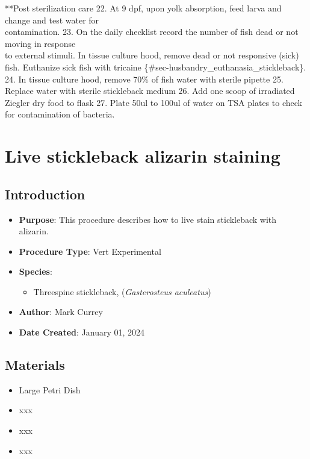 \documentclass[
  letterpaper,
  DIV=11,
  numbers=noendperiod]{scrreprt}
\providecommand{\tightlist}{%
  \setlength{\itemsep}{0pt}\setlength{\parskip}{0pt}}\usepackage{longtable,booktabs,array}
\begin{document}
**Post sterilization care 22. At 9 dpf, upon yolk absorption, feed larva
and change and test water for\\
contamination. 23. On the daily checklist record the number of fish dead
or not moving in response\\
to external stimuli. In tissue culture hood, remove dead or not
responsive (sick) fish. Euthanize sick fish with tricaine
\{\#sec-husbandry\_euthanasia\_stickleback\}. 24. In tissue culture
hood, remove 70\% of fish water with sterile pipette 25. Replace water
with sterile stickleback medium 26. Add one scoop of irradiated Ziegler
dry food to flask 27. Plate 50ul to 100ul of water on TSA plates to
check for contamination of bacteria.

\hypertarget{sec-vert_exp_live_alizarin_SB}{%
\chapter{Live stickleback alizarin
staining}\label{sec-vert_exp_live_alizarin_SB}}

\hypertarget{introduction-53}{%
\section{Introduction}\label{introduction-53}}

\begin{itemize}
\tightlist
\item
  \textbf{Purpose}: This procedure describes how to live stain
  stickleback with alizarin.
\item
  \textbf{Procedure Type}: Vert Experimental
\item
  \textbf{Species}:

  \begin{itemize}
  \tightlist
  \item
    Threespine stickleback, (\emph{Gasterosteus aculeatus})
  \end{itemize}
\item
  \textbf{Author}: Mark Currey
\item
  \textbf{Date Created}: January 01, 2024
\end{itemize}

\hypertarget{materials-49}{%
\section{Materials}\label{materials-49}}

\begin{itemize}
\tightlist
\item
  Large Petri Dish
\item
  xxx
\item
  xxx
\item
  xxx
\end{itemize}
\end{document}
